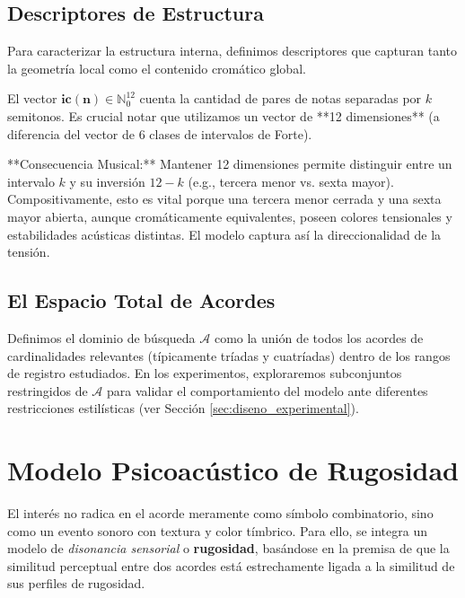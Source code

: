 \subsection{Descriptores de Estructura}

Para caracterizar la estructura interna, definimos descriptores que capturan tanto la geometría local como el contenido cromático global.

\begin{definition}
El vector $\mathbf{ic}(\mathbf{n}) \in \mathbb{N}_0^{12}$ cuenta la cantidad de pares de notas separadas por $k$ semitonos. Es crucial notar que utilizamos un vector de **12 dimensiones** (a diferencia del vector de 6 clases de intervalos de Forte).
\end{definition}

**Consecuencia Musical:** Mantener 12 dimensiones permite distinguir entre un intervalo $k$ y su inversión $12-k$ (e.g., tercera menor vs. sexta mayor). Compositivamente, esto es vital porque una tercera menor cerrada y una sexta mayor abierta, aunque cromáticamente equivalentes, poseen colores tensionales y estabilidades acústicas distintas. El modelo captura así la direccionalidad de la tensión.

\subsection{El Espacio Total de Acordes}

Definimos el dominio de búsqueda $\mathcal{A}$ como la unión de todos los acordes de cardinalidades relevantes (típicamente tríadas y cuatríadas) dentro de los rangos de registro estudiados. En los experimentos, exploraremos subconjuntos restringidos de $\mathcal{A}$ para validar el comportamiento del modelo ante diferentes restricciones estilísticas (ver Sección \ref{sec:diseno_experimental}).

\section{Modelo Psicoacústico de Rugosidad}
\label{sec:modelo_psicoacustico}

El interés no radica en el acorde meramente como símbolo combinatorio, sino como un evento sonoro con textura y color tímbrico. Para ello, se integra un modelo de \textit{disonancia sensorial} o \textbf{rugosidad}, basándose en la premisa de que la similitud perceptual entre dos acordes está estrechamente ligada a la similitud de sus perfiles de rugosidad.


